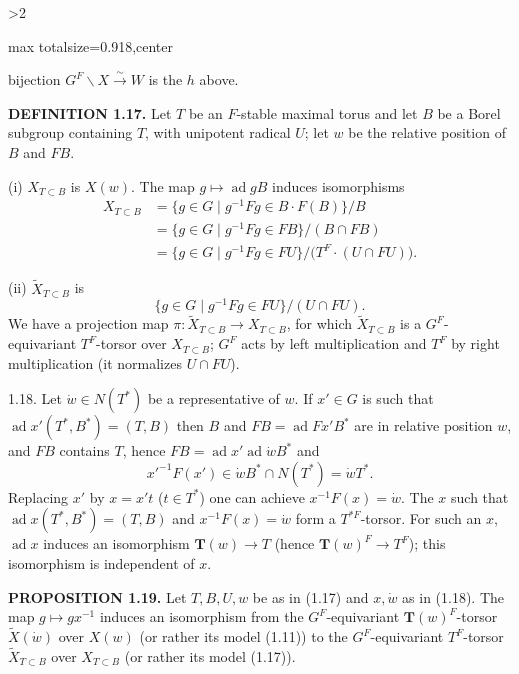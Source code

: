 \documentclass[9pt,twoside]{extarticle}
\newcommand{\EditionPage}[3]{%
  \ifnum#1>2\clearpage\fi
  \pdfbookmark[1]{Printed page #2}{en-folio-#2}%
  \hypertarget{en-physical-#1}{}%
  \noindent\begin{adjustbox}{max totalsize={\textwidth}{0.918\textheight},center}
  \begin{minipage}[t]{\textwidth}
  \fontsize{9.4}{11.1}\selectfont\justifying
  #3
  \end{minipage}
  \end{adjustbox}%
}
\begin{document}
\EditionPage{13}{114}{%
bijection \(G^F\backslash X\xrightarrow{\sim}W\) is the \(h\) above.\par

\noindent\textbf{DEFINITION 1.17.} Let \(T\) be an \(F\)-stable maximal torus and let \(B\) be a Borel subgroup containing \(T\), with unipotent radical \(U\); let \(w\) be the relative position of \(B\) and \(FB\).\par

(i) \(X_{T\subset B}\) is \(X(w)\). The map \(g\mapsto\operatorname{ad}gB\) induces isomorphisms \[
\begin{aligned}
X_{T\subset B}
&=\{g\in G\mid g^{-1}Fg\in B\cdot F(B)\}/B\\
&=\{g\in G\mid g^{-1}Fg\in FB\}/(B\cap FB)\\
&=\{g\in G\mid g^{-1}Fg\in FU\}/\bigl(T^F\cdot(U\cap FU)\bigr).
\end{aligned}
\]\par

(ii) \(\widetilde X_{T\subset B}\) is \[
\{g\in G\mid g^{-1}Fg\in FU\}/(U\cap FU).
\] We have a projection map \(\pi:\widetilde X_{T\subset B}\to X_{T\subset B}\), for which \(\widetilde X_{T\subset B}\) is a \(G^F\)-equivariant \(T^F\)-torsor over \(X_{T\subset B}\); \(G^F\) acts by left multiplication and \(T^F\) by right multiplication (it normalizes \(U\cap FU\)).\par

1.18. Let \(\dot w\in N(T^*)\) be a representative of \(w\). If \(x'\in G\) is such that \(\operatorname{ad}x'(T^*,B^*)=(T,B)\) then \(B\) and \(FB=\operatorname{ad}Fx'B^*\) are in relative position \(w\), and \(FB\) contains \(T\), hence \(FB=\operatorname{ad}x'\operatorname{ad}\dot wB^*\) and \[
x'^{-1}F(x')\in\dot wB^*\cap N(T^*)=\dot wT^*.
\] Replacing \(x'\) by \(x=x't\) (\(t\in T^*\)) one can achieve \(x^{-1}F(x)=\dot w\). The \(x\) such that \(\operatorname{ad}x(T^*,B^*)=(T,B)\) and \(x^{-1}F(x)=\dot w\) form a \(T^{*F}\)-torsor. For such an \(x\), \(\operatorname{ad}x\) induces an isomorphism \(\mathbf T(w)\to T\) (hence \(\mathbf T(w)^F\to T^F\)); this isomorphism is independent of \(x\).\par

\noindent\textbf{PROPOSITION 1.19.} Let \(T,B,U,w\) be as in (1.17) and \(x,\dot w\) as in (1.18). The map \(g\mapsto gx^{-1}\) induces an isomorphism from the \(G^F\)-equivariant \(\mathbf T(w)^F\)-torsor \(\widetilde X(\dot w)\) over \(X(w)\) (or rather its model (1.11)) to the \(G^F\)-equivariant \(T^F\)-torsor \(\widetilde X_{T\subset B}\) over \(X_{T\subset B}\) (or rather its model (1.17)).\par

}
\end{document}
